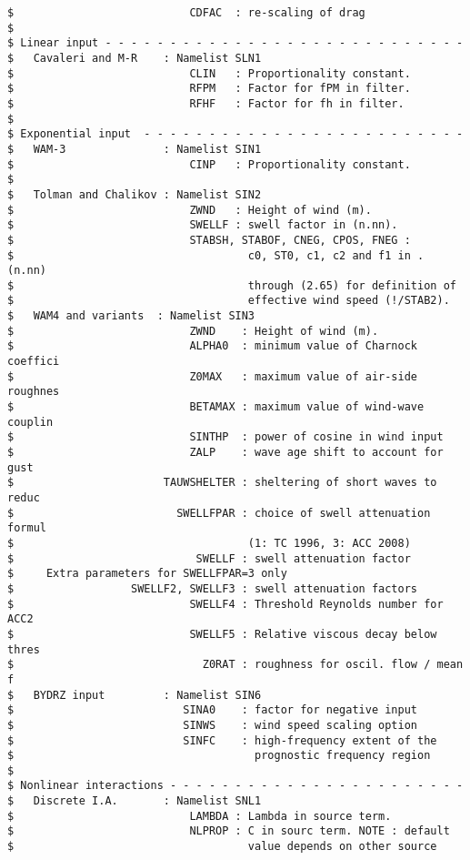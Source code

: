 \begin{footnotesize}
\begin{verbatim}
$                           CDFAC  : re-scaling of drag
$
$ Linear input - - - - - - - - - - - - - - - - - - - - - - - - - - - -
$   Cavaleri and M-R    : Namelist SLN1
$                           CLIN   : Proportionality constant.
$                           RFPM   : Factor for fPM in filter.
$                           RFHF   : Factor for fh in filter.
$
$ Exponential input  - - - - - - - - - - - - - - - - - - - - - - - - -
$   WAM-3               : Namelist SIN1
$                           CINP   : Proportionality constant.
$
$   Tolman and Chalikov : Namelist SIN2
$                           ZWND   : Height of wind (m).
$                           SWELLF : swell factor in (n.nn).
$                           STABSH, STABOF, CNEG, CPOS, FNEG :
$                                    c0, ST0, c1, c2 and f1 in . (n.nn)
$                                    through (2.65) for definition of
$                                    effective wind speed (!/STAB2).
$   WAM4 and variants  : Namelist SIN3
$                           ZWND    : Height of wind (m).
$                           ALPHA0  : minimum value of Charnock coeffici
$                           Z0MAX   : maximum value of air-side roughnes
$                           BETAMAX : maximum value of wind-wave couplin
$                           SINTHP  : power of cosine in wind input
$                           ZALP    : wave age shift to account for gust
$                       TAUWSHELTER : sheltering of short waves to reduc
$                         SWELLFPAR : choice of swell attenuation formul
$                                    (1: TC 1996, 3: ACC 2008)
$                            SWELLF : swell attenuation factor
$     Extra parameters for SWELLFPAR=3 only 
$                  SWELLF2, SWELLF3 : swell attenuation factors 
$                           SWELLF4 : Threshold Reynolds number for ACC2
$                           SWELLF5 : Relative viscous decay below thres
$                             Z0RAT : roughness for oscil. flow / mean f
$   BYDRZ input         : Namelist SIN6
$                          SINA0    : factor for negative input
$                          SINWS    : wind speed scaling option
$                          SINFC    : high-frequency extent of the
$                                     prognostic frequency region
$
$ Nonlinear interactions - - - - - - - - - - - - - - - - - - - - - - -
$   Discrete I.A.       : Namelist SNL1
$                           LAMBDA : Lambda in source term.
$                           NLPROP : C in sourc term. NOTE : default
$                                    value depends on other source

\end{verbatim}
\end{footnotesize}
